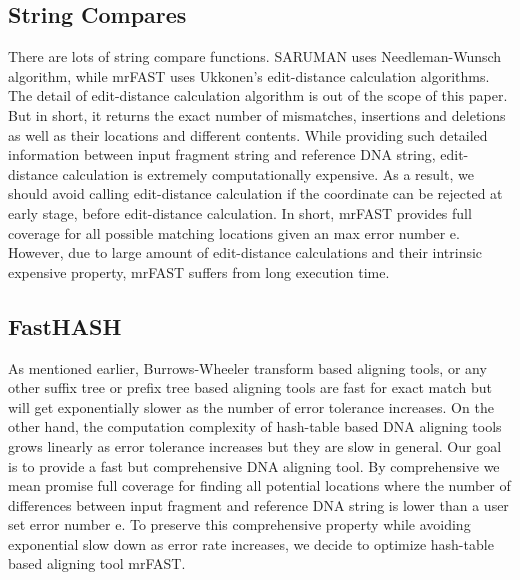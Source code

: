 \subsection{String Compares} 

There are lots of string compare functions.  SARUMAN uses Needleman-Wunsch
algorithm, while mrFAST uses Ukkonen’s edit-distance calculation algorithms.
The detail of edit-distance calculation algorithm is out of the scope of this
paper. But in short, it returns the exact number of mismatches, insertions and
deletions as well as their locations and different contents. While providing
such detailed information between input fragment string and reference DNA
string, edit-distance calculation is extremely computationally expensive. As a
result, we should avoid calling edit-distance calculation if the coordinate can
be rejected at early stage, before edit-distance calculation.  In short, mrFAST
provides full coverage for all possible matching locations given an max error
number e. However, due to large amount of edit-distance calculations and their
intrinsic expensive property, mrFAST suffers from long execution time. \\

\subsection{FastHASH} 

As mentioned earlier, Burrows-Wheeler transform based aligning tools, or any
other suffix tree or prefix tree based aligning tools are fast for exact match
but will get exponentially slower as the number of error tolerance increases.
On the other hand, the computation complexity of hash-table based DNA aligning
tools grows linearly as error tolerance increases but they are slow in general.
Our goal is to provide a fast but comprehensive DNA aligning tool. By
comprehensive we mean promise full coverage for finding all potential locations
where the number of differences between input fragment and reference DNA string
is lower than a user set error number e. To preserve this comprehensive
property while avoiding exponential slow down as error rate increases, we
decide to optimize hash-table based aligning tool mrFAST. \\



